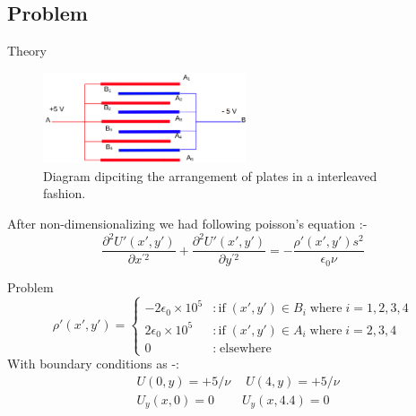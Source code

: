 \documentclass{beamer}
\begin{document}
	\subsection{Problem}
	\begin{frame}{Theory}
		\fontsize{10pt}{5mm}\selectfont

			\begin{figure}[h]
				\centering
				\includegraphics[width=6cm]{insert.png}
				\caption{\small Diagram dipciting the arrangement of plates in a interleaved fashion.}
			\label{fig 1: the capacitor}
			\end{figure}
			After non-dimensionalizing we had following poisson's equation :-
			$$ \frac{\partial^2U'(x',y') }{\partial x^{'2}} + \frac{\partial^2U'(x',y') }{\partial y^{'2}}= -\frac{\rho'(x',y') s^2}{\epsilon_0 \nu} $$
			
		\end{frame}
	\begin{frame}{Problem}
		\begin{equation}
			\rho'(x',y') =  \begin{cases}
				-2\epsilon_0 \times 10^5  & :\text{if} \; (x',y') \in B_i \; \text{where} \; i = 1,2,3,4 \\
				2\epsilon_0 \times 10^5 & :\text{if} \; (x',y') \in A_i \; \text{where} \; i = 2,3,4 \\
				0  & : \; \text{elsewhere}
			\end{cases}
		\end{equation}
		With boundary conditions as -:
		\begin{align}
			& U(0,y) = +5/\nu \quad \ U(4,y) = +5/\nu \\ 
			& U_y(x,0) = 0 \qquad \ U_y(x,4.4) = 0 
		\end{align}
		
		\end{frame}	
\end{document}
